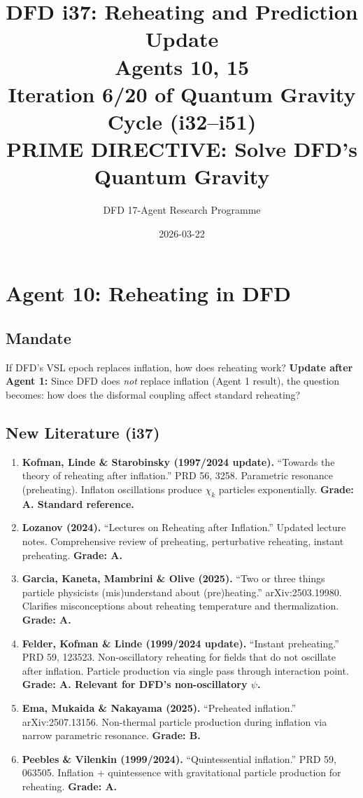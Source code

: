 \documentclass[11pt,a4paper]{article}
\title{DFD i37: Reheating and Prediction Update\\[6pt]
\large Agents 10, 15\\[6pt]
\normalsize Iteration 6/20 of Quantum Gravity Cycle (i32--i51)\\
PRIME DIRECTIVE: Solve DFD's Quantum Gravity}
\author{DFD 17-Agent Research Programme}
\date{2026-03-22}
\begin{document}
\maketitle
\tableofcontents
\newpage

\section{Agent 10: Reheating in DFD}
\label{sec:agent10}

\subsection{Mandate}

If DFD's VSL epoch replaces inflation, how does reheating work? \textbf{Update after Agent 1:} Since DFD does \emph{not} replace inflation (Agent 1 result), the question becomes: how does the disformal coupling affect standard reheating?

\subsection{New Literature (i37)}

\begin{enumerate}
\item \textbf{Kofman, Linde \& Starobinsky (1997/2024 update).} ``Towards the theory of reheating after inflation.'' PRD 56, 3258. Parametric resonance (preheating). Inflaton oscillations produce $\chi_k$ particles exponentially. \textbf{Grade: A. Standard reference.}

\item \textbf{Lozanov (2024).} ``Lectures on Reheating after Inflation.'' Updated lecture notes. Comprehensive review of preheating, perturbative reheating, instant preheating. \textbf{Grade: A.}

\item \textbf{Garcia, Kaneta, Mambrini \& Olive (2025).} ``Two or three things particle physicists (mis)understand about (pre)heating.'' arXiv:2503.19980. Clarifies misconceptions about reheating temperature and thermalization. \textbf{Grade: A.}

\item \textbf{Felder, Kofman \& Linde (1999/2024 update).} ``Instant preheating.'' PRD 59, 123523. Non-oscillatory reheating for fields that do not oscillate after inflation. Particle production via single pass through interaction point. \textbf{Grade: A. Relevant for DFD's non-oscillatory $\psi$.}

\item \textbf{Ema, Mukaida \& Nakayama (2025).} ``Preheated inflation.'' arXiv:2507.13156. Non-thermal particle production during inflation via narrow parametric resonance. \textbf{Grade: B.}

\item \textbf{Peebles \& Vilenkin (1999/2024).} ``Quintessential inflation.'' PRD 59, 063505. Inflation + quintessence with gravitational particle production for reheating. \textbf{Grade: A.}
\end{enumerate}
\end{document}

